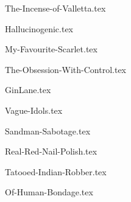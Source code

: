 \begin{songs}{}
  {The-Incense-of-Valletta.tex}
  \sclearpage
  
  {Hallucinogenic.tex}
  \sclearpage
  
  {My-Favourite-Scarlet.tex}
  \sclearpage
  
  {The-Obsession-With-Control.tex}
  \sclearpage
  
  {GinLane.tex}
  \sclearpage

  {Vague-Idols.tex}
  \sclearpage

  {Sandman-Sabotage.tex}
  \sclearpage

  {Real-Red-Nail-Polish.tex}
  \sclearpage

  {Tatooed-Indian-Robber.tex}
  \sclearpage

  {Of-Human-Bondage.tex}
  \sclearpage

\end{songs}
